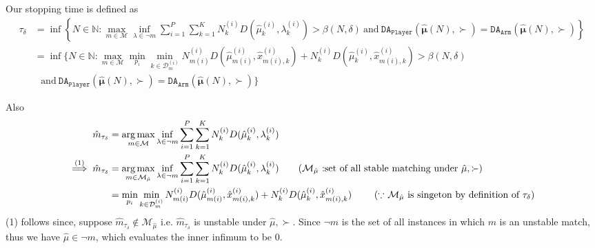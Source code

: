 \documentclass{article}
\DeclareMathOperator*{\argmax}{arg\,max}
\begin{document}
Our stopping time is defined as
\begin{align*}
    \tau_{\delta} &= \inf\left\{N\in\mathbb{N}:\max_{m\in\mathcal{M}} \inf_{\lambda\in\neg m}\sum_{i=1}^P\sum_{k=1}^{K}N^{(i)}_kD(\hat{\mu}^{(i)}_k,\lambda^{(i)}_k) >\beta(N,\delta)\ \text{and}\ \texttt{DA}_{\texttt{Player}}(\hat{\bm{\mu}}(N),\succ)=\texttt{DA}_{\texttt{Arm}}(\hat{\bm{\mu}}(N),\succ) \right\}\\
    &= \inf\Bigg\{N\in\mathbb{N}:\max_{m\in \mathcal{M}}\min_{p_i}\min_{k\in \mathcal{D}_m^{(i)}}N^{(i)}_{m(i)} D(\hat{\mu}_{m(i)}^{(i)},\hat{x}_{m(i),k}^{(i)})+ N^{(i)}_{k} D(\hat{\mu}_{k}^{(i)},\hat{x}_{m(i),k}^{(i)})>\beta(N,\delta)\\
    &\ \  \ \text{and}\ \texttt{DA}_{\texttt{Player}}(\hat{\bm{\mu}}(N),\succ)=\texttt{DA}_{\texttt{Arm}}(\hat{\bm{\mu}}(N),\succ) \Bigg\}
\end{align*}

Also
\begin{align*}
    \hat{m}_{\tau_{\delta}} &= \argmax_{m\in{\mathcal{M}}} \inf_{\lambda\in\neg m}\sum_{i=1}^P\sum_{k=1}^{K}N^{(i)}_kD(\hat{\mu}^{(i)}_k,\lambda^{(i)}_k)\\
   \overset{(1)}{\implies} \hat{m}_{\tau_{\delta}}  &=\argmax_{m\in\mathcal{M}_{\hat{\mu}}} \inf_{\lambda\in\neg m}\sum_{i=1}^P\sum_{k=1}^{K}N^{(i)}_kD(\hat{\mu}^{(i)}_k,\lambda^{(i)}_k)\tag{$\mathcal{M}_{\hat{\mu}}$ :set of all stable matching under $\hat{\mu},\succ$}\\
   & =\min_{p_i} \min_{k\in \mathcal{D}_m^{(i)}}N^{(i)}_{m(i)} D(\hat{\mu}_{m(i)}^{(i)},\hat{x}_{m(i),k}^{(i)})+ N^{(i)}_{k} D(\hat{\mu}_{k}^{(i)},\hat{x}_{m(i),k}^{(i)})\ \tag{$\because$ $\mathcal{M}_{\hat{\mu}}$ is singeton by definition of $\tau_{\delta}$}
\end{align*}
(1) follows since, suppose $\hat{m}_{\tau_{\delta}}\not\in\mathcal{M}_{\hat{\mu}}$ i.e. $\hat{m}_{\tau_{\delta}}$ is unstable under $\hat{\mu},\succ$. Since $\neg m$ is the set of all instances in which $m$ is an unstable match, thus we have $\hat{\mu}\in \neg m$, which evaluates the inner infimum to be 0. 
\end{document}
